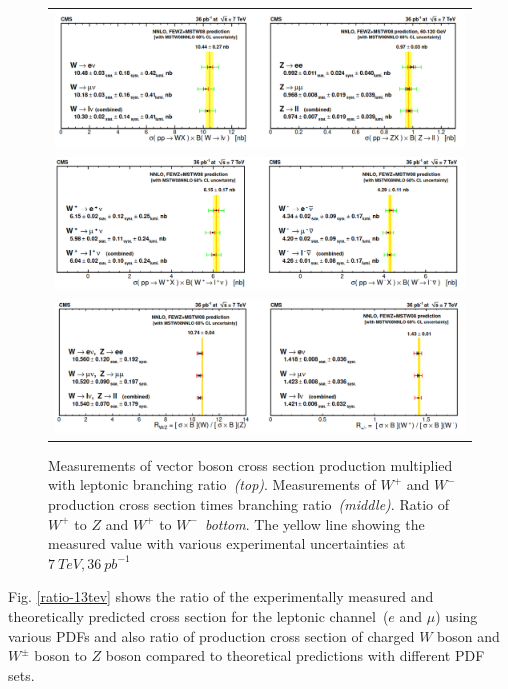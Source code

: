 \begin{figure}[H]
\centering
\begin{tabular}{c}
\includegraphics[scale=0.4]{chapter3/7tev1.png}\\
\includegraphics[scale=0.4]{chapter3/7tev2.png}\\
\includegraphics[scale=0.4]{chapter3/7tev3.png}
\end{tabular}
\caption{Measurements of vector boson cross section production multiplied with leptonic branching ratio~\textit{(top)}. Measurements of $W^{+}$ and $W^{-}$ production cross section times branching ratio~\textit{(middle)}. Ratio of $W^{+}$ to $Z$ and $W^{+}$ to $W^{-}$~\textit{bottom}. The yellow line showing the measured value with various experimental uncertainties at $7~TeV, 36~pb^{-1}$~\cite{2011}}
\label{7tev.data}
\end{figure}

Fig. \ref{ratio-13tev} shows the ratio of the experimentally measured and theoretically predicted cross section for the leptonic channel~($e$ and $\mu$) using various PDFs and also ratio of  production cross section of charged $W$ boson and $W^{\pm}$ boson to $Z$ boson compared to theoretical predictions with different PDF sets.

